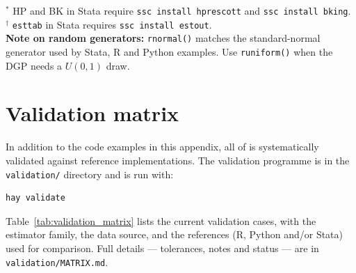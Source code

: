 \noindent
$^*$ HP and BK in Stata require \texttt{ssc install hprescott} and \texttt{ssc install bking}.\\
$^\dagger$ \texttt{esttab} in Stata requires \texttt{ssc install estout}.\\[4pt]
\noindent\textbf{Note on random generators:} \texttt{rnormal()} matches the standard-normal
generator used by Stata, R and Python examples. Use \texttt{runiform()} when the
DGP needs a $U(0,1)$ draw.

\section{Validation matrix}
\label{sec:validation_matrix}

In addition to the code examples in this appendix, all of \hayashi{} is
systematically validated against reference implementations. The validation
programme is in the \texttt{validation/} directory and is run with:

\begin{lstlisting}
hay validate
\end{lstlisting}

Table~\ref{tab:validation_matrix} lists the current validation cases, with the
estimator family, the data source, and the references (R, Python and/or Stata)
used for comparison. Full details --- tolerances, notes and status --- are in
\texttt{validation/MATRIX.md}.

